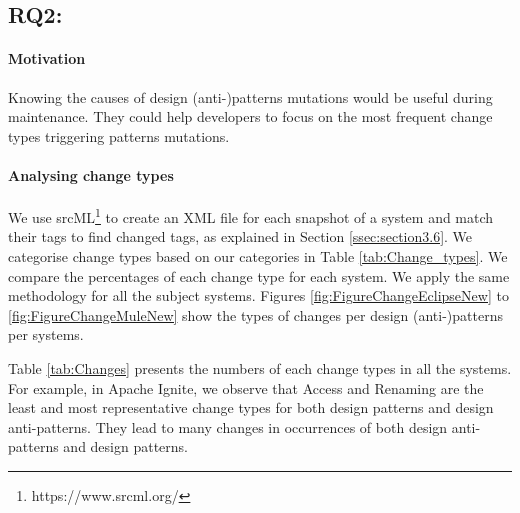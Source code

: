 \subsection{\textbf{RQ2:} \textit{\RQTwo}}

\paragraph{\textbf{Motivation}} Knowing the causes of design (anti-)patterns mutations would be useful during maintenance. They could help developers to focus on the most frequent change types triggering patterns mutations. 


\paragraph{\textbf{Analysing change types}} We use srcML\footnote{https://www.srcml.org/} to create an XML file for each snapshot of a system and match their tags to find changed tags, as explained in Section \ref{ssec:section3.6}. We categorise change types based on our categories in Table \ref{tab:Change_types}. We compare the percentages of each change type for each system. We apply the same methodology for all the subject systems.
Figures \ref{fig:FigureChangeEclipseNew} to \ref{fig:FigureChangeMuleNew} show the types of changes per design (anti-)patterns per systems. 

Table \ref{tab:Changes} presents the numbers of each change types in all the systems. For example, in Apache Ignite, we observe that Access and  Renaming are the least and most representative change types for both design patterns and design anti-patterns. They lead to many changes in occurrences of both design anti-patterns and design patterns.

